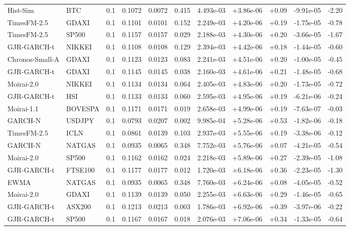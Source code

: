 \begin{tabular}{llrrrrrrrrr}
Hist-Sim & BTC & 0.1 & 0.1072 & 0.0072 & 0.415 & 4.493e-03 & +3.86e-06 & +0.09 & -9.91e-05 & -2.20 \\
TimesFM-2.5 & GDAXI & 0.1 & 0.1101 & 0.0101 & 0.152 & 2.249e-03 & +4.20e-06 & +0.19 & -1.75e-05 & -0.78 \\
TimesFM-2.5 & SP500 & 0.1 & 0.1157 & 0.0157 & 0.029 & 2.188e-03 & +4.30e-06 & +0.20 & -3.66e-05 & -1.67 \\
GJR-GARCH-t & NIKKEI & 0.1 & 0.1108 & 0.0108 & 0.129 & 2.394e-03 & +4.42e-06 & +0.18 & -1.44e-05 & -0.60 \\
Chronos-Small-A & GDAXI & 0.1 & 0.1123 & 0.0123 & 0.083 & 2.241e-03 & +4.51e-06 & +0.20 & -1.00e-05 & -0.45 \\
GJR-GARCH-t & GDAXI & 0.1 & 0.1145 & 0.0145 & 0.038 & 2.160e-03 & +4.61e-06 & +0.21 & -1.48e-05 & -0.68 \\
Moirai-2.0 & NIKKEI & 0.1 & 0.1134 & 0.0134 & 0.064 & 2.405e-03 & +4.83e-06 & +0.20 & -1.73e-05 & -0.72 \\
GJR-GARCH-t & HSI & 0.1 & 0.1133 & 0.0133 & 0.060 & 2.595e-03 & +4.95e-06 & +0.19 & -6.21e-06 & -0.24 \\
Moirai-1.1 & BOVESPA & 0.1 & 0.1171 & 0.0171 & 0.019 & 2.658e-03 & +4.99e-06 & +0.19 & -7.63e-07 & -0.03 \\
GARCH-N & USDJPY & 0.1 & 0.0793 & 0.0207 & 0.002 & 9.985e-04 & +5.28e-06 & +0.53 & -1.82e-06 & -0.18 \\
TimesFM-2.5 & ICLN & 0.1 & 0.0861 & 0.0139 & 0.103 & 2.937e-03 & +5.55e-06 & +0.19 & -3.38e-06 & -0.12 \\
GARCH-N & NATGAS & 0.1 & 0.0935 & 0.0065 & 0.348 & 7.752e-03 & +5.76e-06 & +0.07 & -4.21e-05 & -0.54 \\
Moirai-2.0 & SP500 & 0.1 & 0.1162 & 0.0162 & 0.024 & 2.218e-03 & +5.89e-06 & +0.27 & -2.39e-05 & -1.08 \\
GJR-GARCH-t & FTSE100 & 0.1 & 0.1177 & 0.0177 & 0.012 & 1.720e-03 & +6.18e-06 & +0.36 & -2.23e-05 & -1.30 \\
EWMA & NATGAS & 0.1 & 0.0935 & 0.0065 & 0.348 & 7.760e-03 & +6.24e-06 & +0.08 & -4.05e-05 & -0.52 \\
Moirai-2.0 & GDAXI & 0.1 & 0.1139 & 0.0139 & 0.050 & 2.255e-03 & +6.63e-06 & +0.29 & -1.46e-05 & -0.65 \\
GJR-GARCH-t & ASX200 & 0.1 & 0.1213 & 0.0213 & 0.003 & 1.786e-03 & +6.92e-06 & +0.39 & -3.97e-06 & -0.22 \\
GJR-GARCH-t & SP500 & 0.1 & 0.1167 & 0.0167 & 0.018 & 2.076e-03 & +7.06e-06 & +0.34 & -1.33e-05 & -0.64 \\

\end{tabular}

